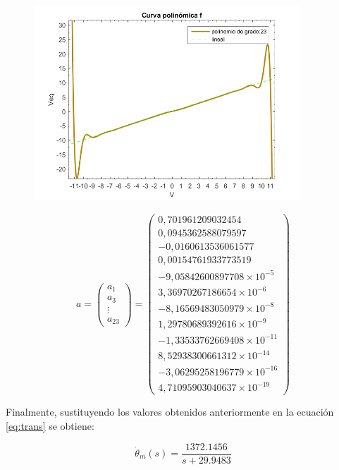 \documentclass[a4paper]{article}
\begin{document}
\begin{figure}[htbp]
	\begin{center}
		\includegraphics[width=10cm]{curva_polinomica}
		\caption{}
		\label{polinomioA}
	\end{center}
\end{figure}

\begin{equation}
a =
\left( \begin{array}{c}
a_1 \\
a_3 \\
\vdots \\
a_23
\end{array} \right)
=
\left( \begin{array}{c}
0,701961209032454  \\
0,0945362588079597  \\
-0,0160613536061577  \\
0,00154761933773519  \\
-9,05842600897708 \times 10^{-5}  \\
3,36970267186654\times 10^{-6}  \\
-8,16569483050979\times 10^{-8}  \\
1,29780689392616\times 10^{-9}  \\
-1,33533762669408\times 10^{-11}  \\
8,52938300661312\times 10^{-14}  \\
-3,06295258196779\times 10^{-16}  \\
4,71095903040637\times 10^{-19}
\end{array} \right)
\end{equation}

Finalmente, sustituyendo los valores obtenidos anteriormente en la ecuación \ref{eq:trans} se obtiene:

\begin{equation}
	\label{eq:transVal}
	\dot{\theta}_m (s) = \frac{1372.1456}{s+29.9483}
\end{equation}
\end{document}
